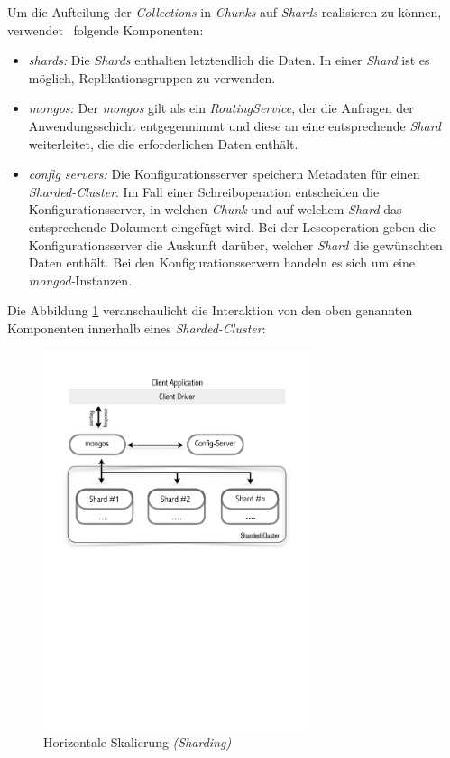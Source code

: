Um die Aufteilung der \textit{Collections} in \textit{Chunks} auf \textit{Shards} realisieren zu können, verwendet \mongo\ folgende Komponenten:
\begin{itemize}
\item \textit{shards:} Die \textit{Shards} enthalten letztendlich die Daten. In einer \textit{Shard} ist es möglich, Replikationsgruppen zu verwenden.
\item \textit{mongos:} Der \textit{mongos} gilt als ein \textit{RoutingService}, der die Anfragen der Anwendungsschicht entgegennimmt und diese an eine entsprechende \textit{Shard} weiterleitet, die die erforderlichen Daten enthält.
\item \textit{config servers:} Die Konfigurationsserver speichern Metadaten für einen \textit{Sharded-Cluster}. Im Fall einer Schreiboperation entscheiden die Konfigurationsserver, in welchen \textit{Chunk} und auf welchem \textit{Shard} das entsprechende Dokument eingefügt wird. Bei der Leseoperation geben die Konfigurationsserver die Auskunft darüber, welcher \textit{Shard} die gewünschten Daten enthält. Bei den Konfigurationsservern handeln es sich um eine \textit{mongod-}Instanzen.
\end{itemize}
Die Abbildung \ref{img:shardedCluster} veranschaulicht die Interaktion von den oben genannten Komponenten innerhalb eines \textit{Sharded-Cluster}:
\begin{figure}[H]
\centering
\includegraphics[trim = 0mm 139mm 0mm 22mm, clip, width=0.7\textwidth]{resources/replicaSet/shardedCluster}
\caption[Horizontale Skalierung \textit{(Sharding)}]{Horizontale Skalierung \textit{(Sharding)}}
\label{img:shardedCluster}
\end{figure}

